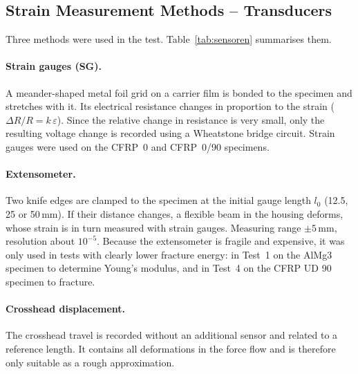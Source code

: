 \documentclass[11pt,a4paper]{article}
\newcommand{\eps}{\varepsilon}
\begin{document}
\subsection{Strain Measurement Methods -- Transducers}

Three methods were used in the test. Table~\ref{tab:sensoren} summarises them.

\paragraph{Strain gauges (SG).} A meander-shaped metal foil grid on a carrier
film is bonded to the specimen and stretches with it. Its electrical
resistance changes in proportion to the strain ($\Delta R/R = k\,\eps$).
Since the relative change in resistance is very small, only the resulting
voltage change is recorded using a Wheatstone bridge circuit. Strain gauges
were used on the CFRP~0\textdegree{} and CFRP~0\textdegree/90\textdegree{}
specimens.

\paragraph{Extensometer.} Two knife edges are clamped to the specimen at the
initial gauge length $l_0$ (12.5, 25 or 50\,mm). If their distance changes, a
flexible beam in the housing deforms, whose strain is in turn measured with
strain gauges. Measuring range $\pm 5$\,mm, resolution about $10^{-5}$.
Because the extensometer is fragile and expensive, it was only used in tests
with clearly lower fracture energy: in Test~1 on the AlMg3 specimen to
determine Young's modulus, and in Test~4 on the CFRP UD 90\textdegree{}
specimen to fracture.

\paragraph{Crosshead displacement.} The crosshead travel is recorded without
an additional sensor and related to a reference length. It contains all
deformations in the force flow and is therefore only suitable as a rough
approximation.
\end{document}
